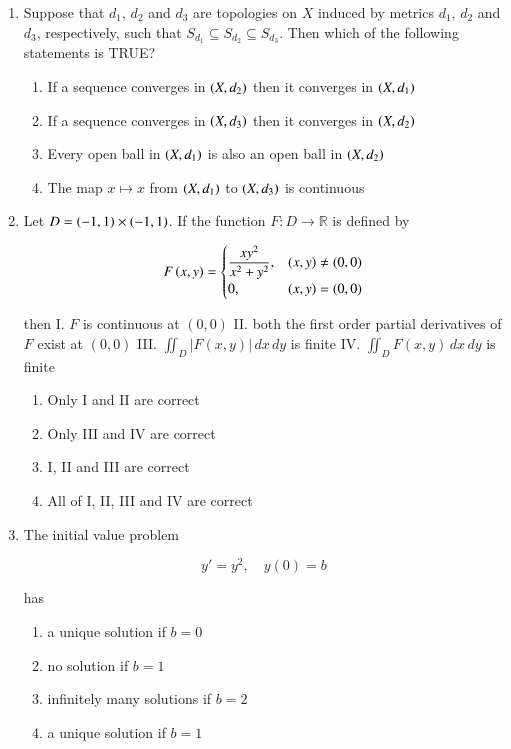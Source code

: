 \documentclass[journal,12pt,onecolumn]{IEEEtran}
\theoremstyle{remark}
\begin{document}
\begin{enumerate}[start=1, label=Q.\arabic*]
\hfill{}
\item Suppose that $d_1$, $d_2$ and $d_3$ are topologies on $X$ induced by metrics $d_1$, $d_2$ and $d_3$, respectively, such that $S_{d_1} \subseteq S_{d_2} \subseteq S_{d_3}$. Then which of the following statements is TRUE?

\begin{enumerate}
\item If a sequence converges in $\left(X,d_2\right)$ then it converges in $\left(X,d_1\right)$  
\item If a sequence converges in $\left(X,d_3\right)$ then it converges in $\left(X,d_2\right)$  
\item Every open ball in $\left(X,d_1\right)$ is also an open ball in $\left(X,d_2\right)$  
\item The map $x \mapsto x$ from $\left(X,d_1\right)$ to $\left(X,d_3\right)$ is continuous  
\end{enumerate}

\hfill{}

\item Let $D = \left(-1,1\right) \times \left(-1,1\right)$. If the function $F : D \to \mathbb{R}$ is defined by  

\[
F\left(x,y\right) = \begin{cases}
\dfrac{xy^2}{x^2+y^2}, & (x,y) \neq (0,0) \\
0, & (x,y) = (0,0)
\end{cases}
\]

then  
I. $F$ is continuous at $(0,0)$  
II. both the first order partial derivatives of $F$ exist at $(0,0)$  
III. $\iint_D |F(x,y)| \, dx\,dy$ is finite  
IV. $\iint_D F(x,y) \, dx\,dy$ is finite  

\begin{enumerate}
\item Only I and II are correct  
\item Only III and IV are correct  
\item I, II and III are correct  
\item All of I, II, III and IV are correct  
\end{enumerate}

\hfill{}

\item The initial value problem  

\[
y' = y^2, \quad y(0) = b
\]

has  

\begin{enumerate}
\item a unique solution if $b=0$  
\item no solution if $b=1$  
\item infinitely many solutions if $b=2$  
\item a unique solution if $b=1$  
\end{enumerate}


\end{enumerate}
\end{document}
